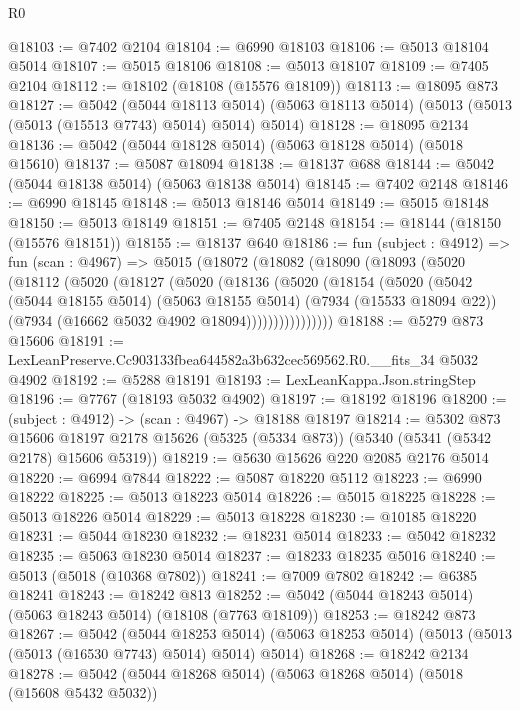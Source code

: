 \begin{lexlean}{R0}
\begin{coremodule}
@18103 := @7402 @2104
@18104 := @6990 @18103
@18106 := @5013 @18104 @5014
@18107 := @5015 @18106
@18108 := @5013 @18107
@18109 := @7405 @2104
@18112 := @18102 (@18108 (@15576 @18109))
@18113 := @18095 @873
@18127 := @5042
    (@5044 @18113 @5014)
    (@5063 @18113 @5014)
    (@5013 (@5013 (@5013 (@15513 @7743) @5014) @5014) @5014)
@18128 := @18095 @2134
@18136 := @5042 (@5044 @18128 @5014) (@5063 @18128 @5014) (@5018 @15610)
@18137 := @5087 @18094
@18138 := @18137 @688
@18144 := @5042 (@5044 @18138 @5014) (@5063 @18138 @5014)
@18145 := @7402 @2148
@18146 := @6990 @18145
@18148 := @5013 @18146 @5014
@18149 := @5015 @18148
@18150 := @5013 @18149
@18151 := @7405 @2148
@18154 := @18144 (@18150 (@15576 @18151))
@18155 := @18137 @640
@18186 := fun (subject : @4912) =>
  fun (scan : @4967) =>
  @5015
    (@18072
      (@18082
        (@18090
          (@18093
            (@5020
              (@18112
                (@5020
                  (@18127
                    (@5020
                      (@18136
                        (@5020
                          (@18154
                            (@5020
                              (@5042
                                (@5044 @18155 @5014)
                                (@5063 @18155 @5014)
                                (@7934 (@15533 @18094 @22))
                                (@7934 (@16662 @5032 @4902 @18094))))))))))))))))
@18188 := @5279 @873 @15606
@18191 := LexLeanPreserve.Cc903133fbea644582a3b632cec569562.R0.__fits_34 @5032 @4902
@18192 := @5288 @18191
@18193 := LexLeanKappa.Json.stringStep
@18196 := @7767 (@18193 @5032 @4902)
@18197 := @18192 @18196
@18200 := (subject : @4912) -> (scan : @4967) -> @18188 @18197
@18214 := @5302
    @873
    @15606
    @18197
    @2178
    @15626
    (@5325 (@5334 @873))
    (@5340 (@5341 (@5342 @2178) @15606 @5319))
@18219 := @5630 @15626 @220 @2085 @2176 @5014
@18220 := @6994 @7844
@18222 := @5087 @18220 @5112
@18223 := @6990 @18222
@18225 := @5013 @18223 @5014
@18226 := @5015 @18225
@18228 := @5013 @18226 @5014
@18229 := @5013 @18228
@18230 := @10185 @18220
@18231 := @5044 @18230
@18232 := @18231 @5014
@18233 := @5042 @18232
@18235 := @5063 @18230 @5014
@18237 := @18233 @18235 @5016
@18240 := @5013 (@5018 (@10368 @7802))
@18241 := @7009 @7802
@18242 := @6385 @18241
@18243 := @18242 @813
@18252 := @5042 (@5044 @18243 @5014) (@5063 @18243 @5014) (@18108 (@7763 @18109))
@18253 := @18242 @873
@18267 := @5042
    (@5044 @18253 @5014)
    (@5063 @18253 @5014)
    (@5013 (@5013 (@5013 (@16530 @7743) @5014) @5014) @5014)
@18268 := @18242 @2134
@18278 := @5042 (@5044 @18268 @5014) (@5063 @18268 @5014) (@5018 (@15608 @5432 @5032))

\end{coremodule}
\end{lexlean}
